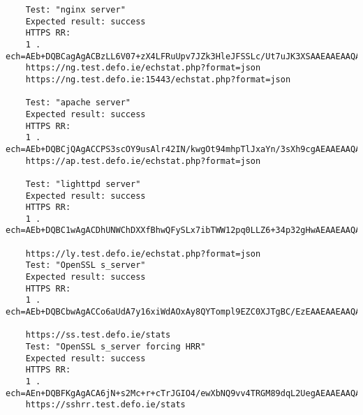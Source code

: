 \begin{verbatim}
    Test: "nginx server"
    Expected result: success
    HTTPS RR:
    1 . ech=AEb+DQBCagAgACBzLL6V07+zX4LFRuUpv7JZk3HleJFSSLc/Ut7uJK3XSAAEAAEAAQATbmctcHViLnRlc3QuZGVmby5pZQAA
    https://ng.test.defo.ie/echstat.php?format=json
    https://ng.test.defo.ie:15443/echstat.php?format=json

    Test: "apache server"
    Expected result: success
    HTTPS RR:
    1 . ech=AEb+DQBCjQAgACCPS3scOY9usAlr42IN/kwgOt94mhpTlJxaYn/3sXh9cgAEAAEAAQATYXAtcHViLnRlc3QuZGVmby5pZQAA
    https://ap.test.defo.ie/echstat.php?format=json

    Test: "lighttpd server"
    Expected result: success
    HTTPS RR:
    1 . ech=AEb+DQBC1wAgACDhUNWChDXXfBhwQFySLx7ibTWW12pq0LLZ6+34p32gHwAEAAEAAQATbHktcHViLnRlc3QuZGVmby5pZQAA

    https://ly.test.defo.ie/echstat.php?format=json
    Test: "OpenSSL s_server"
    Expected result: success
    HTTPS RR:
    1 . ech=AEb+DQBCbwAgACCo6aUdA7y16xiWdAOxAy8QYTompl9EZC0XJTgBC/EzEAAEAAEAAQATc3MtcHViLnRlc3QuZGVmby5pZQAA

    https://ss.test.defo.ie/stats
    Test: "OpenSSL s_server forcing HRR"
    Expected result: success
    HTTPS RR:
    1 . ech=AEn+DQBFKgAgACA6jN+s2Mc+r+cTrJGIO4/ewXbNQ9vv4TRGM89dqL2UegAEAAEAAQAWc3NocnItcHViLnRlc3QuZGVmby5pZQAA
    https://sshrr.test.defo.ie/stats

\end{verbatim}
\normalsize

